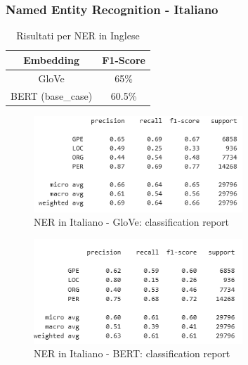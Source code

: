 \subsubsection{Named Entity Recognition - Italiano}
\begin{table}[hbt!]
    \centering

    \begin{tabular}{|c|c|}
      \hline
        Embedding & F1-Score \\
      \hline
          GloVe  &   65\% \\
      \hline
          BERT (base\_case)  &   60.5\% \\
      \hline
    \end{tabular}
    \caption{Risultati per NER in Inglese}
    \label{tab:ner_ita_results}
\end{table}
\begin{figure}[hbt!]
    \centering
    \includegraphics[width=0.7\textwidth]{img/results/creport_ner_ita_glove.png}
    \caption{NER in Italiano - GloVe: classification report}
    \label{fig:creport_ner_ita_glove}
\end{figure}
\begin{figure}[hbt!]
    \centering
    \includegraphics[width=0.7\textwidth]{img/results/creport_ner_ita_bert.png}
    \caption{NER in Italiano - BERT: classification report}
    \label{fig:creport_ner_ita_bert}
\end{figure}
